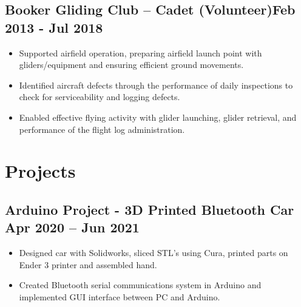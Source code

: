 \documentclass[a4paper,9pt]{article}
\begin{document}
\subsection*{\textbf{Booker Gliding Club – Cadet (Volunteer)}\hfill Feb 2013 - Jul 2018}
\begin{itemize}[noitemsep]

	\item Supported airfield operation, preparing airfield launch point with gliders/equipment and ensuring efficient ground movements.
	\item Identified aircraft defects through the performance of daily inspections to check for serviceability and logging defects.
	\item Enabled effective flying activity with glider launching, glider retrieval, and performance of the flight log administration.
\end{itemize}


\section*{Projects}

%
%
%
%

\subsection*{\textbf{Arduino Project - 3D Printed Bluetooth Car } \hfill  Apr 2020 – Jun 2021}
\begin{itemize}[noitemsep]
	\item  Designed car with Solidworks, sliced STL's using Cura, printed parts on Ender 3 printer and assembled hand.
	\item  Created Bluetooth serial communications system in Arduino and implemented GUI interface between PC and Arduino.

\end{itemize}
\end{document}
